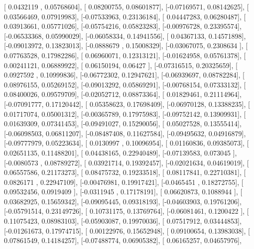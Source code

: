 \documentclass{article}
\begin{document}
       [ 0.0432119 ,  0.05768604],
       [ 0.08200755,  0.08601877],
       [-0.07169571,  0.08142625],
       [ 0.03566469,  0.07919983],
       [-0.07533963,  0.23136184],
       [ 0.04447283,  0.06280487],
       [ 0.03913661,  0.05771026],
       [-0.05754216,  0.05823283],
       [-0.00976728,  0.23395574],
       [-0.06533368,  0.05990029],
       [-0.06058334,  0.14941556],
       [ 0.04367133,  0.14571898],
       [-0.09013972,  0.13823013],
       [-0.0888679 ,  0.15008329],
       [-0.03067075,  0.2308634 ],
       [ 0.07763528,  0.17982286],
       [ 0.06960071,  0.12313121],
       [-0.01624958,  0.05761378],
       [ 0.00241121,  0.06889922],
       [ 0.06150194,  0.06427   ],
       [-0.07316515,  0.20325659],
       [ 0.0927592 ,  0.10999836],
       [-0.06772302,  0.12947621],
       [-0.06939697,  0.08782284],
       [ 0.08976155,  0.05269152],
       [-0.09013292,  0.05869291],
       [-0.00768154,  0.07333132],
       [ 0.08400026,  0.09579709],
       [-0.02052712,  0.08873364],
       [ 0.01829461,  0.21114964],
       [-0.07091777,  0.17120442],
       [ 0.05358623,  0.17698409],
       [-0.06970128,  0.13388235],
       [ 0.01717074,  0.05001312],
       [-0.00365789,  0.17975983],
       [-0.09752142,  0.13909931],
       [ 0.01639309,  0.07341453],
       [-0.09491027,  0.15290056],
       [ 0.05027528,  0.13555414],
       [-0.06098503,  0.06811207],
       [-0.08487408,  0.11627584],
       [-0.09495632,  0.04916879],
       [-0.09777979,  0.05223634],
       [ 0.0130997 ,  0.10096954],
       [ 0.01160836,  0.09385073],
       [ 0.02651135,  0.11488201],
       [ 0.04438165,  0.22940489],
       [-0.07139583,  0.073045  ],
       [-0.0080573 ,  0.08789272],
       [ 0.03921714,  0.19392457],
       [-0.02021634,  0.04619019],
       [ 0.06557586,  0.21173273],
       [ 0.08475732,  0.19233518],
       [ 0.08117841,  0.22710381],
       [ 0.0826171 ,  0.22947109],
       [-0.00476981,  0.19917421],
       [-0.0465451 ,  0.18272755],
       [ 0.09532456,  0.0919409 ],
       [-0.0311945 ,  0.17178191],
       [ 0.06620873,  0.1088944 ],
       [ 0.03682925,  0.15659342],
       [-0.09095445,  0.09318193],
       [-0.04603903,  0.19761206],
       [-0.05791514,  0.23149726],
       [ 0.10731175,  0.13769764],
       [-0.06081461,  0.1200422 ],
       [ 0.11075423,  0.08983103],
       [-0.05903087,  0.19970036],
       [ 0.07517912,  0.03444853],
       [-0.01261673,  0.17974715],
       [ 0.00122976,  0.15652948],
       [ 0.09100654,  0.13983038],
       [ 0.07861549,  0.14184257],
       [-0.07488774,  0.06905382],
       [ 0.06165257,  0.04657976],
\end{document}
